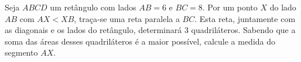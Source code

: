Seja $ABCD$ um retângulo com lados $AB = 6$ e $BC = 8$.
Por um ponto $X$ do lado $AB$ com $AX < XB$, traça-se uma reta paralela a $BC$.
Esta reta, juntamente com as diagonais e os lados do retângulo, determinará $3$ quadriláteros.
Sabendo que a soma das áreas desses quadriláteros é a maior possível, calcule a medida do segmento $AX$.
